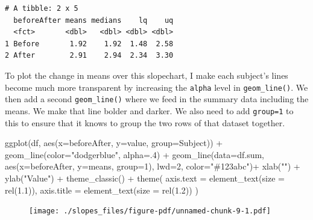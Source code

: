 \documentclass[
  letterpaper,
  DIV=11,
  numbers=noendperiod]{scrreprt}
\newenvironment{Shaded}{\begin{snugshade}}{\end{snugshade}}
\newcommand{\AttributeTok}[1]{\textcolor[rgb]{0.40,0.45,0.13}{#1}}
\newcommand{\DecValTok}[1]{\textcolor[rgb]{0.68,0.00,0.00}{#1}}
\newcommand{\FloatTok}[1]{\textcolor[rgb]{0.68,0.00,0.00}{#1}}
\newcommand{\FunctionTok}[1]{\textcolor[rgb]{0.28,0.35,0.67}{#1}}
\newcommand{\NormalTok}[1]{\textcolor[rgb]{0.00,0.23,0.31}{#1}}
\newcommand{\SpecialCharTok}[1]{\textcolor[rgb]{0.37,0.37,0.37}{#1}}
\newcommand{\StringTok}[1]{\textcolor[rgb]{0.13,0.47,0.30}{#1}}
\begin{document}
\begin{verbatim}
# A tibble: 2 x 5
  beforeAfter means medians    lq    uq
  <fct>       <dbl>   <dbl> <dbl> <dbl>
1 Before       1.92    1.92  1.48  2.58
2 After        2.91    2.94  2.34  3.30
\end{verbatim}

To plot the change in means over this slopechart, I make each subject's
lines become much more transparent by increasing the \texttt{alpha}
level in \texttt{geom\_line()}. We then add a second
\texttt{geom\_line()} where we feed in the summary data including the
means. We make that line bolder and darker. We also need to add
\texttt{group=1} to this to ensure that it knows to group the two rows
of that dataset together.

\begin{Shaded}
\begin{Highlighting}[]
\FunctionTok{ggplot}\NormalTok{(df, }\FunctionTok{aes}\NormalTok{(}\AttributeTok{x=}\NormalTok{beforeAfter, }\AttributeTok{y=}\NormalTok{value, }\AttributeTok{group=}\NormalTok{Subject)) }\SpecialCharTok{+}
  \FunctionTok{geom\_line}\NormalTok{(}\AttributeTok{color=}\StringTok{"dodgerblue"}\NormalTok{, }\AttributeTok{alpha=}\NormalTok{.}\DecValTok{4}\NormalTok{) }\SpecialCharTok{+}
  \FunctionTok{geom\_line}\NormalTok{(}\AttributeTok{data=}\NormalTok{df.sum, }
            \FunctionTok{aes}\NormalTok{(}\AttributeTok{x=}\NormalTok{beforeAfter, }\AttributeTok{y=}\NormalTok{means, }\AttributeTok{group=}\DecValTok{1}\NormalTok{), }
            \AttributeTok{lwd=}\DecValTok{2}\NormalTok{, }\AttributeTok{color=}\StringTok{"\#123abc"}\NormalTok{)}\SpecialCharTok{+}
  \FunctionTok{xlab}\NormalTok{(}\StringTok{""}\NormalTok{) }\SpecialCharTok{+}
  \FunctionTok{ylab}\NormalTok{(}\StringTok{"Value"}\NormalTok{) }\SpecialCharTok{+}
  \FunctionTok{theme\_classic}\NormalTok{() }\SpecialCharTok{+}
  \FunctionTok{theme}\NormalTok{(}
    \AttributeTok{axis.text =} \FunctionTok{element\_text}\NormalTok{(}\AttributeTok{size =} \FunctionTok{rel}\NormalTok{(}\FloatTok{1.1}\NormalTok{)),}
    \AttributeTok{axis.title =} \FunctionTok{element\_text}\NormalTok{(}\AttributeTok{size =} \FunctionTok{rel}\NormalTok{(}\FloatTok{1.2}\NormalTok{))}
\NormalTok{  ) }
\end{Highlighting}
\end{Shaded}

\begin{figure}[H]

{\centering \texttt{[image: ./slopes\_files/figure-pdf/unnamed-chunk-9-1.pdf]}

}

\end{figure}
\end{document}
